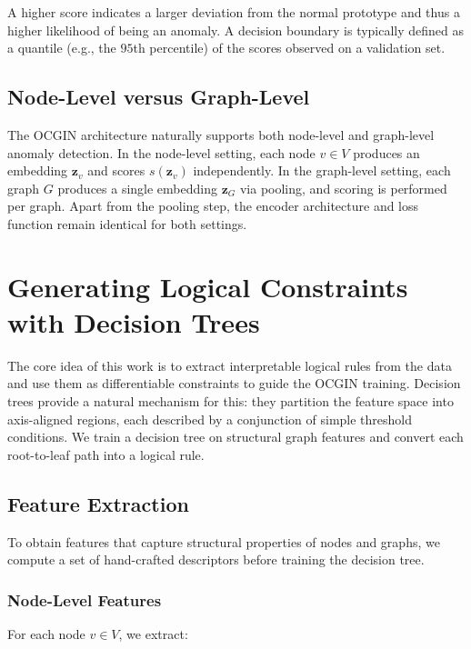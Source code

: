 A higher score indicates a larger deviation from the normal prototype and thus a higher likelihood of being an anomaly. A decision boundary is typically defined as a quantile (e.g., the $95$th percentile) of the scores observed on a validation set.

\subsection{Node-Level versus Graph-Level}
\label{sec:node_vs_graph}

The \ac{OCGIN} architecture naturally supports both node-level and graph-level anomaly detection. In the node-level setting, each node $v \in V$ produces an embedding $\mathbf{z}_v$ and scores $s(\mathbf{z}_v)$ independently. In the graph-level setting, each graph $G$ produces a single embedding $\mathbf{z}_G$ via pooling, and scoring is performed per graph. Apart from the pooling step, the encoder architecture and loss function remain identical for both settings.


\section{Generating Logical Constraints with Decision Trees}
\label{sec:dt_constraints}

The core idea of this work is to extract interpretable logical rules from the data and use them as differentiable constraints to guide the OCGIN training. Decision trees provide a natural mechanism for this: they partition the feature space into axis-aligned regions, each described by a conjunction of simple threshold conditions. We train a decision tree on structural graph features and convert each root-to-leaf path into a logical rule.

\subsection{Feature Extraction}
\label{sec:feature_extraction}

To obtain features that capture structural properties of nodes and graphs, we compute a set of hand-crafted descriptors before training the decision tree.

\subsubsection{Node-Level Features}

For each node $v \in V$, we extract:

